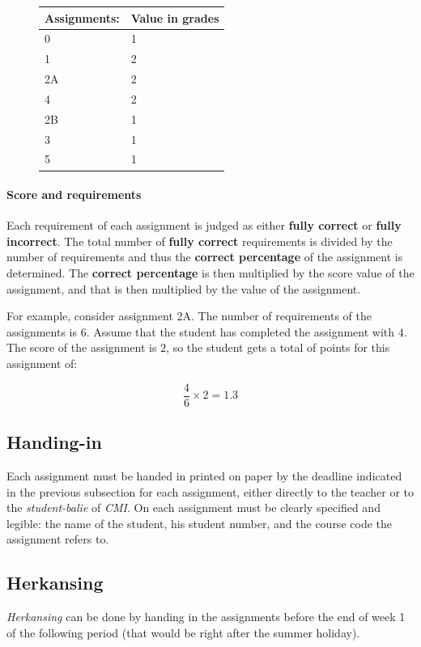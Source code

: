 \documentclass[a4paper, 10pt]{article}
\begin{document}
\begin{figure}
\center		
\begin{tabular}{|p{3cm}|p{3cm}|}
	\hline
	\textbf{Assignments:} & \textbf{Value in grades} \\
	\hline
	0 & 1 \\
	\hline
	1 & 2 \\
	\hline
	2A & 2 \\
	\hline
	4 & 2 \\
	\hline
	2B & 1 \\
	\hline
	3 & 1 \\
	\hline
	5 & 1 \\
	\hline
\end{tabular}
\end{figure}
		
		\paragraph*{Score and requirements}
			Each requirement of each assignment is judged as either \textbf{fully correct} or \textbf{fully incorrect}. The total number of \textbf{fully correct} requirements is divided by the number of requirements and thus the \textbf{correct percentage} of the assignment is determined. The \textbf{correct percentage} is then multiplied by the score value of the assignment, and that is then multiplied by the value of the assignment.
			
			For example, consider assignment 2A. The number of requirements of the assignments is $6$. Assume that the student has completed the assignment with $4$. The score of the assignment is $2$, so the student gets a total of points for this assignment of:
			
			$$\frac{4}{6} \times {2} = 1.3$$
			
	\subsection{Handing-in}
		Each assignment must be handed in printed on paper by the deadline indicated in the previous subsection for each assignment, either directly to the teacher or to the \textit{student-balie} of \textit{CMI}. On each assignment must be clearly specified and legible: the name of the student, his student number, and the course code the assignment refers to.

	\subsection{Herkansing}
		\textit{Herkansing} can be done by handing in the assignments before the end of week 1 of the following period (that would be right after the summer holiday).
\end{document}
